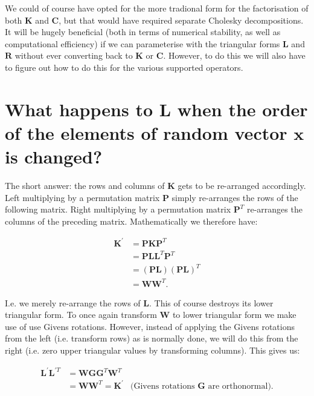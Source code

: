\documentclass[oneside,english]{scrbook}
\begin{document}
We could of course have opted for the more tradional form for the
factorisation of both $\bm{K}$ and $\bm{C}$, but that would have
required separate Cholesky decompositions. It will be hugely
beneficial (both in terms of numerical stability, as well as
computational efficiency) if we can parameterise with the triangular
forms $\bm{L}$ and $\bm{R}$ without ever converting back to $\bm{K}$
or $\bm{C}$. However, to do this we will also have to figure out how
to do this for the various supported operators.

\section{What happens to $\bm{L}$ when the order of the elements of
  random vector $\bm{x}$ is changed?}  The short answer: the rows and
columns of $\bm{K}$ gets to be re-arranged accordingly. Left
multiplying by a permutation matrix $\bm{P}$ simply re-arranges the
rows of the following matrix. Right multiplying by a permutation
matrix $\bm{P}^T$ re-arranges the columns of the preceding
matrix. Mathematically we therefore have:

\begin{align*}
  \bm{K}^{'} &= \bm{P}\bm{K}\bm{P}^T \\
  &= \bm{P}\bm{L}\bm{L}^T\bm{P}^T \\
  &= (\bm{P}\bm{L})(\bm{P}\bm{L})^T\\
  &= \bm{W}\bm{W}^T.
\end{align*}

I.e. we merely re-arrange the rows of $\bm{L}$. This of course
destroys its lower triangular form. To once again transform $\bm{W}$
to lower triangular form we make use of use Givens rotations. However,
instead of applying the Givens rotations from the left (i.e. transform
rows) as is normally done, we will do this from the right (i.e. zero
upper triangular values by transforming columns). This gives us:

\begin{align*}
  \bm{L^{'}}\bm{L}^{'T} &=
  \bm{W}\bm{G}\bm{G}^T\bm{W}^T\\
  &= \bm{W}\bm{W}^T  = \bm{K}^{'} &\text{(Givens rotations $\bm{G}$ are orthonormal).}
\end{align*}
\end{document}
